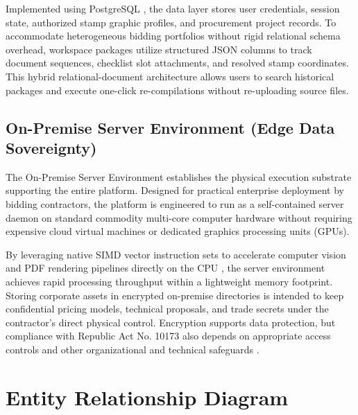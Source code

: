 Implemented using PostgreSQL \cite{ref55}, the data layer stores user credentials, session state, authorized stamp graphic profiles, and procurement project records.
To accommodate heterogeneous bidding portfolios without rigid relational schema overhead, workspace packages utilize structured JSON columns to track document sequences, checklist slot attachments, and resolved stamp coordinates.
This hybrid relational-document architecture allows users to search historical packages and execute one-click re-compilations without re-uploading source files.

\subsection{On-Premise Server Environment (Edge Data Sovereignty)}
The On-Premise Server Environment establishes the physical execution substrate supporting the entire platform.
Designed for practical enterprise deployment by bidding contractors, the platform is engineered to run as a self-contained server daemon on standard commodity multi-core computer hardware without requiring expensive cloud virtual machines or dedicated graphics processing units (GPUs).

By leveraging native SIMD vector instruction sets to accelerate computer vision and PDF rendering pipelines directly on the CPU \cite{ref33, ref40}, the server environment achieves rapid processing throughput within a lightweight memory footprint.
Storing corporate assets in encrypted on-premise directories is intended to keep confidential pricing models, technical proposals, and trade secrets under the contractor's direct physical control. Encryption supports data protection, but compliance with Republic Act No. 10173 also depends on appropriate access controls and other organizational and technical safeguards \cite{ref6}.

\section{Entity Relationship Diagram}
\label{sec:erd_data_flow}
\setcounter{figure}{0}


